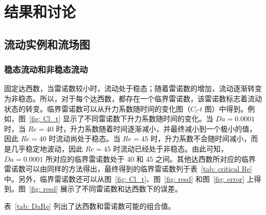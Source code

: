 \chapter{结果和讨论}

\section{流动实例和流场图}

\subsection{稳态流动和非稳态流动}

固定达西数，当雷诺数较小时，流动处于稳态；随着雷诺数的增加，流动逐渐转变为非稳态。所以，对于每个达西数，都存在一个临界雷诺数，该雷诺数标志着流动状态的转变。临界雷诺数可以从升力系数随时间的变化图（$C_l$-$t$ 图）中得到。例如，图~\ref{fig: Cl_t} 显示了不同雷诺数下升力系数随时间的变化。当 $Da=0.0001$ 时，当 $Re=40$ 时，升力系数随着时间逐渐减小，并最终减小到一个极小的值，因此 $Re=40$ 时流动尚处于稳态。当 $Re=45$ 时，升力系数不会随时间减小，而是几乎稳定地波动，因此 $Re=45$ 时流动已经处于非稳态。由此可知，$Da=0.0001$ 所对应的临界雷诺数处于 40 和 45 之间。其他达西数所对应的临界雷诺数可以由同样的方法得出，最终得到的临界雷诺数列于表~\ref{tab: critical Re} 中。另外，临界雷诺数还可以从图~\ref{fig: Cl_t}、图~\ref{fig: resd} 和图~\ref{fig: error} 上得到。图~\ref{fig: resd} 展示了不同雷诺数和达西数下的误差。

表~\ref{tab: DaRe} 列出了达西数和雷诺数可能的组合值。

